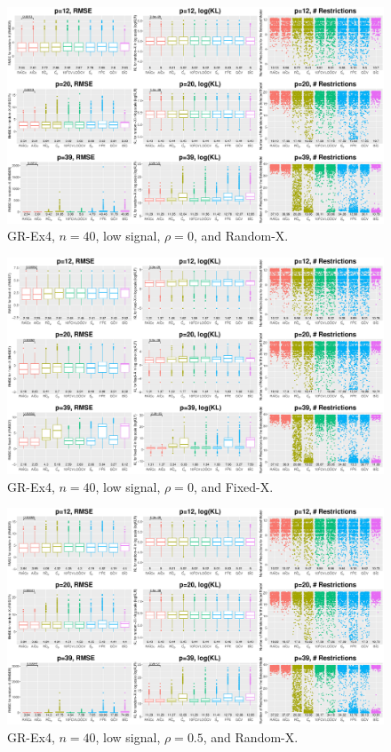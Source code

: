 \clearpage
\begin{figure}[!ht]
\centering
\includegraphics[width=\textwidth]{figures/supplement/randomx_GR-Ex4_n40_lsnr_rho0.eps}
\caption{GR-Ex4, $n=40$, low signal, $\rho=0$, and Random-X.}
\end{figure}
\begin{figure}[!ht]
\centering
\includegraphics[width=\textwidth]{figures/supplement/fixedx_GR-Ex4_n40_lsnr_rho0.eps}
\caption{GR-Ex4, $n=40$, low signal, $\rho=0$, and Fixed-X.}
\end{figure}
\clearpage
\begin{figure}[!ht]
\centering
\includegraphics[width=\textwidth]{figures/supplement/randomx_GR-Ex4_n40_lsnr_rho05.eps}
\caption{GR-Ex4, $n=40$, low signal, $\rho=0.5$, and Random-X.}
\end{figure}
